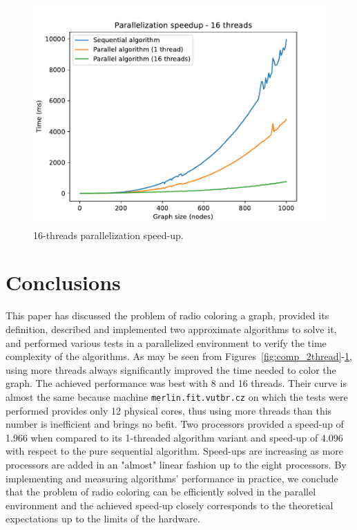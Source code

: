 \documentclass[11pt,a4paper]{article}
\begin{document}
\vspace{-1.5em}
\begin{figure}[H]
   \centering
   \begin{minipage}{.5\textwidth}
      \centering
      \includegraphics[width=0.9\linewidth]{comp_16thread.pdf}
      \caption{16-threads parallelization speed-up.}
      \label{fig:comp_16thread}
   \end{minipage}%
\end{figure}


\section{Conclusions}
\label{sec:conclusions}

This paper has discussed the problem of radio coloring a graph, provided its definition, described and implemented two approximate algorithms to solve it, and performed various tests in a parallelized environment to verify the time complexity of the algorithms. As may be seen from Figures~\ref{fig:comp_2thread}-\ref{fig:comp_16thread}, using more threads always significantly improved the time needed to color the graph. The achieved performance was best with 8 and 16 threads. Their curve is almost the same because machine \texttt{merlin.fit.vutbr.cz} on which the tests were performed provides only 12 physical cores, thus using more threads than this number is inefficient and brings no befit. Two processors provided a speed-up of 1.966 when compared to its 1-threaded algorithm variant and speed-up of 4.096 with respect to the pure sequential algorithm. Speed-ups are increasing as more processors are added in an "almost" linear fashion up to the eight processors. By implementing and measuring algorithms' performance in practice, we conclude that the problem of radio coloring can be efficiently solved in the parallel environment and the achieved speed-up closely corresponds to the theoretical expectations up to the limits of the hardware.
\end{document}
